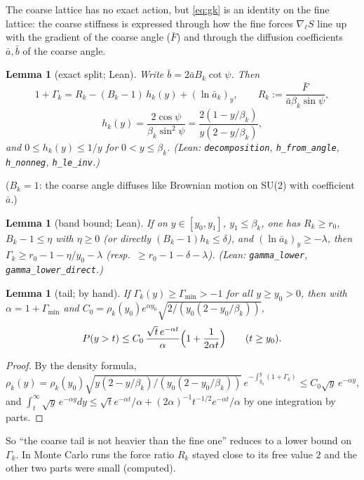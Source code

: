\documentclass[11pt,a4paper]{article}
\newtheorem{lemma}[theorem]{Lemma}
\theoremstyle{definition}
\theoremstyle{remark}
\newcommand{\code}[1]{\texttt{#1}}
\newcommand{\abar}{\bar a}
\newcommand{\bbar}{\bar b}
\newcommand{\Fbar}{\bar F}
\begin{document}
The coarse lattice has no exact action, but \eqref{eq:gk} is an identity on the fine lattice: the coarse stiffness is expressed through how the fine forces $\nabla_\ell S$ line up with the gradient of the coarse angle ($\Fbar$) and through the diffusion coefficients $\abar,\bbar$ of the coarse angle.

\begin{lemma}[exact split; Lean]\label{lem:split}
Write $\bbar=2\abar B_k\cot\psi$. Then
\[
1+\Gamma_k=R_k-(B_k-1)\,h_k(y)+(\ln\abar_k)_y,\qquad R_k:=\frac{\Fbar}{\abar\beta_k\sin\psi},\]\[h_k(y)=\frac{2\cos\psi}{\beta_k\sin^2\psi}=\frac{2(1-y/\beta_k)}{y(2-y/\beta_k)},
\]
and $0\le h_k(y)\le1/y$ for $0<y\le\beta_k$. (Lean: \code{decomposition}, \code{h\_from\_angle}, \code{h\_nonneg}, \code{h\_le\_inv}.)
\end{lemma}

($B_k=1$: the coarse angle diffuses like Brownian motion on SU(2) with coefficient $\abar$.)

\begin{lemma}[band bound; Lean]\label{lem:band}
If on $y\in[y_0,y_1]$, $y_1\le\beta_k$, one has $R_k\ge r_0$, $B_k-1\le\eta$ with $\eta\ge0$ (or directly $(B_k-1)h_k\le\delta$), and $(\ln\abar_k)_y\ge-\lambda$, then $\Gamma_k\ge r_0-1-\eta/y_0-\lambda$ (resp.\ $\ge r_0-1-\delta-\lambda$). (Lean: \code{gamma\_lower}, \code{gamma\_lower\_direct}.)
\end{lemma}

\begin{lemma}[tail; by hand]\label{lem:tail}
If $\Gamma_k(y)\ge\Gamma_{\min}>-1$ for all $y\ge y_0>0$, then with $\alpha=1+\Gamma_{\min}$ and $C_0=\rho_k(y_0)e^{\alpha y_0}\sqrt{2/(y_0(2-y_0/\beta_k))}$,
\[
P(y>t)\le C_0\,\frac{\sqrt t\,e^{-\alpha t}}{\alpha}\Bigl(1+\frac{1}{2\alpha t}\Bigr)\qquad(t\ge y_0).
\]
\end{lemma}

\begin{proof}
By the density formula, $\rho_k(y)=\rho_k(y_0)\sqrt{y(2-y/\beta_k)/(y_0(2-y_0/\beta_k))}\,e^{-\int_{y_0}^y(1+\Gamma_k)}\le C_0\sqrt y\,e^{-\alpha y}$, and $\int_t^\infty\sqrt y\,e^{-\alpha y}dy\le\sqrt te^{-\alpha t}/\alpha+(2\alpha)^{-1}t^{-1/2}e^{-\alpha t}/\alpha$ by one integration by parts.
\end{proof}

So ``the coarse tail is not heavier than the fine one'' reduces to a lower bound on $\Gamma_k$. In Monte Carlo runs the force ratio $R_k$ stayed close to its free value $2$ and the other two parts were small (computed).
\end{document}
